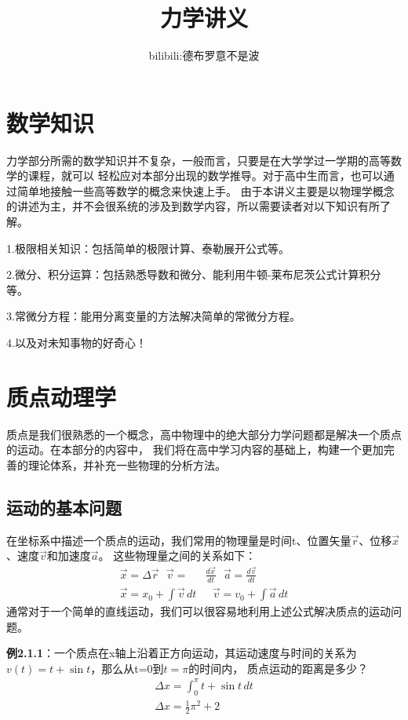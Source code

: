 \documentclass{article}
\title{\bfseries \Huge 力学讲义}  %
\author{bilibili:德布罗意不是波}  %
\date{}  %
\begin{document}
  
\maketitle
\tableofcontents
\newpage

\section{数学知识}
    力学部分所需的数学知识并不复杂，一般而言，只要是在大学学过一学期的高等数学的课程，就可以
    轻松应对本部分出现的数学推导。对于高中生而言，也可以通过简单地接触一些高等数学的概念来快速上手。
    由于本讲义主要是以物理学概念的讲述为主，并不会很系统的涉及到数学内容，所以需要读者对以下知识有所了解。

    1.极限相关知识：包括简单的极限计算、泰勒展开公式等。

    2.微分、积分运算：包括熟悉导数和微分、能利用牛顿-莱布尼茨公式计算积分等。

    3.常微分方程：能用分离变量的方法解决简单的常微分方程。

    4.以及对未知事物的好奇心！

\section{质点动理学}
    质点是我们很熟悉的一个概念，高中物理中的绝大部分力学问题都是解决一个质点的运动。在本部分的内容中，
    我们将在高中学习内容的基础上，构建一个更加完善的理论体系，并补充一些物理的分析方法。

\subsection{运动的基本问题}
    在坐标系中描述一个质点的运动，我们常用的物理量是时间t、位置矢量\(\vec{r}\)、位移\(\vec{x}\)、速度\(\vec{v}\)和加速度\(\vec{a}\)。
    这些物理量之间的关系如下：
    \begin{align*}
        \vec{x} = \varDelta \vec{r}\ \ \  \vec{v}  = &\frac{d\vec{x}}{dt}\ \ \ \vec{a} = \frac{d\vec{v}}{dt} \\
        \vec{x} = x_0 + \int \vec{v} \,dt & \ \ \ \vec{v} = v_0 + \int \vec{a} \,dt 
    \end{align*}
    通常对于一个简单的直线运动，我们可以很容易地利用上述公式解决质点的运动问题。

    \textbf{例2.1.1}：一个质点在x轴上沿着正方向运动，其运动速度与时间的关系为\(v(t)=t+\sin t\)，那么从t=0到\(t=\pi\)的时间内，
    质点运动的距离是多少？
    \begin{align*}
        \varDelta x = \int_0^{\pi} t+\sin t \,dt \\
        \varDelta x = \frac{1}{2}\pi^2 + 2
    \end{align*}
\end{document}
